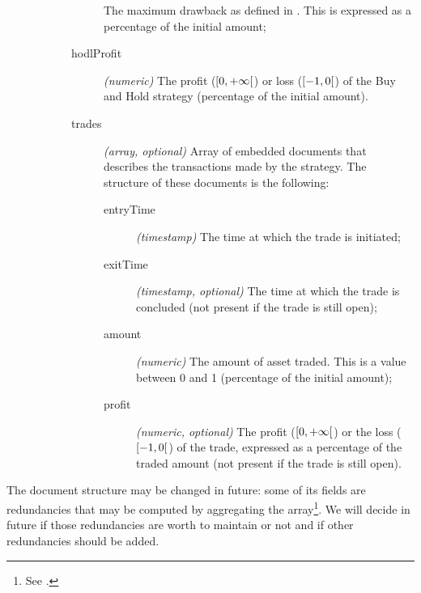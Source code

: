 \begin{description}
\begin{description}
\begin{description}
						The maximum drawback as defined
						in . This is
						expressed as a percentage of the
						initial amount;
					\item[hodlProfit] \textit{(numeric)} The
						profit (\(\interval[open
						right]{0}{+\infty}\)) or loss
						(\(\interval[open
						right]{-1}{0}\)) of the Buy and
						Hold strategy (percentage of the
						initial amount).
					\item[trades] \textit{(array, optional)}
						Array of embedded documents that
						describes the transactions made
						by the strategy. The structure
						of these documents is the
						following:
						\begin{description}
							\item[entryTime]
								\textit{(timestamp)}
								The time at
								which the trade
								is initiated;
							\item[exitTime]
								\textit{(timestamp,
								optional)}
								The time at
								which the trade
								is concluded
								(not present if
								the trade is
								still open);
							\item[amount]
								\textit{(numeric)}
								The amount of
								asset traded.
								This is a value
								between 0 and 1
								(percentage of
								the initial
								amount);
							\item[profit]
								\textit{(numeric,
								optional)} The
								profit
								(\(\interval[open
								right]{0}{+\infty}\))
								or the loss
								(\(\interval[open
								right]{-1}{0}\))
								of the trade,
								expressed as a
								percentage of
								the traded
								amount (not
								present if the
								trade is still
								open).
						\end{description}
				\end{description}
		\end{description}
\end{description}

The  document structure may be changed in future: some of its
fields are redundancies that may be computed by aggregating the 
array\footnote{See .}. We will decide in future if
those redundancies are worth to maintain or not and if other redundancies should
be added.
